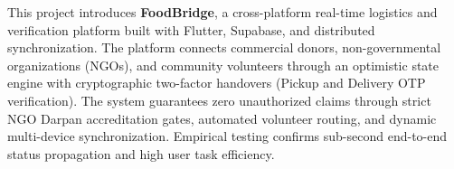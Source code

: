 \documentclass[12pt,a4paper,oneside]{report}
\begin{document}
This project introduces \textbf{FoodBridge}, a cross-platform real-time logistics and verification platform built with Flutter, Supabase, and distributed synchronization. The platform connects commercial donors, non-governmental organizations (NGOs), and community volunteers through an optimistic state engine with cryptographic two-factor handovers (Pickup and Delivery OTP verification). The system guarantees zero unauthorized claims through strict NGO Darpan accreditation gates, automated volunteer routing, and dynamic multi-device synchronization. Empirical testing confirms sub-second end-to-end status propagation and high user task efficiency.

\clearpage

\tableofcontents
\listoffigures
\listoftables
\clearpage

\setcounter{page}{1}








\end{document}
